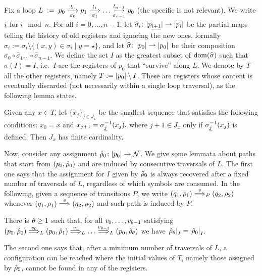 Fix a loop 
	$L \;:=\; p_0 \overset{l_0}{\underset{\sigma_0}{\longrightarrow}} p_1 \overset{l_1}{\underset{\sigma_1}{\longrightarrow}} \dots \overset{l_{n-1}}{\underset{\sigma_{n-1}}{\longrightarrow}} p_0$ (the specific \hdma{} is not relevant).
We write ${\underline{i}}$ for $i \mod n$. 
For all $i=0,\dots,n-1$, let $\widehat{\sigma}_i \colon |p_{\underline{i+1}}| \rightharpoonup |p_i|$ be the partial maps telling the history of old registers and ignoring the new ones, formally $\widehat{\sigma}_i := \sigma_i \setminus \{ (x,y) \in \sigma_i \mid y = \star \}$, and let $\widehat{\sigma} \colon |p_0| \rightharpoonup |p_0|$ be their composition $\widehat{\sigma}_0 \circ \widehat{\sigma}_1 \dots \circ \widehat{\sigma}_{n-1}$. We define the set $I$ as the greatest subset of $\operatorname{dom}(\widehat{\sigma})$ such that $ \widehat{\sigma}(I) = I$,
i.e.\ $I$ are the registers of $p_0$ that ``survive'' along $L$. We denote by $T$ all the other registers, namely $T := |p_0| \setminus I$. These are registers whose content is eventually discarded (not necessarily within a single loop traversal), as the following lemma states.
%
%
\begin{lemma}
\label{lem:rho-forget}
Given any $x \in T$, let $\{x_j\}_{j \in J_x}$ be the smallest sequence that satisfies the following conditions:
$
	x_0 = x
$
and
$
	x_{j+1} = \sigma_{{\underline{j}}}^{-1}(x_j),
$
where $j+1 \in J_x$ only if $\sigma_{{\underline{j}}}^{-1}(x_j)$ is defined. Then $J_x$ has finite cardinality.
\end{lemma}
%
Now, consider any assignment $\hat{\rho}_0 \colon |p_0| \to \mathcal{N}$. We give some lemmata about paths that start from $(p_0,\hat{\rho}_0)$ and are induced by consecutive traversals of $L$. The first one says that the assignment for $I$ given by $\hat{\rho}_0$ is always recovered after a fixed number of traversals of $L$, regardless of which symbols are consumed. In the following, given a sequence of transitions $P$, we write $(q_1,\rho_1) \overset{v}{\Longrightarrow}_{P} (q_2,\rho_2)$ whenever $(q_1,\rho_1) \overset{v}{\Longrightarrow} (q_2,\rho_2)$ and such path is induced by $P$.
%
\begin{lemma} 
\label{lem:idI}
There is $\theta \geq 1$ such that, for all $v_0,\dots,v_{\theta-1}$ satisfying $(p_0,\hat{\rho}_0) \overset{v_0}{\Longrightarrow}_{L} (p_0,\hat{\rho}_1) \overset{v_1}{\Longrightarrow}_{L} \dots \overset{v_{\theta-1}}{\Longrightarrow}_{L} (p_0,\hat{\rho}_\theta)$ we have $\left. \hat{\rho}_\theta \right|_{I} = \left. \hat{\rho}_0 \right|_{I}$.
\end{lemma}
%
The second one says that, after a minimum number of traversals of $L$, a configuration can be reached where the initial values of $T$, namely those assigned by $\hat{\rho}_0$, cannot be found in any of the registers.
